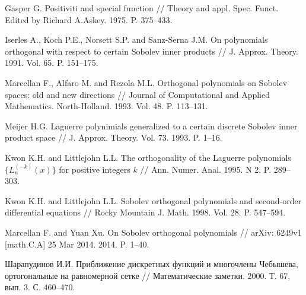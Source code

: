 \begin{thebibliography}{999}

 Gasper G. Positiviti and special function // Theory and appl. Spec. Funct. Edited by Richard A.Askey. 1975. P. 375--433.







Iserles A., Koch P.E., Norsett S.P. and Sanz-Serna J.M. On polynomials  orthogonal  with respect  to certain Sobolev inner products //
J. Approx. Theory. 1991. Vol. 65.  P. 151--175.







Marcellan F., Alfaro M. and Rezola M.L.
Orthogonal polynomials on Sobolev spaces: old and new directions //
Journal of Computational and Applied Mathematics. North-Holland. 1993. Vol. 48. P. 113--131.







Meijer H.G. Laguerre polynimials generalized to a certain discrete Sobolev inner product space // J. Approx. Theory. Vol. 73. 1993. P. 1--16.






Kwon K.H. and Littlejohn L.L.
The orthogonality of the Laguerre polynomials $\{L_n^{(-k)}(x)\}$ for positive integers $k$ //
Ann. Numer. Anal. 1995. N 2. P. 289--303.





 Kwon K.H. and Littlejohn L.L. Sobolev orthogonal polynomials and second-order differential equations // Rocky Mountain J. Math. 1998. Vol. 28. P. 547--594.





Marcellan F. and Yuan Xu.
On Sobolev orthogonal polynomials // arXiv: 6249v1 [math.C.A] 25 Mar 2014. 2014. P. 1--40.





 Шарапудинов И.И.
Приближение дискретных функций и многочлены Чебышева, ортогональные на равномерной сетке //
Математические заметки. 2000. Т. 67, вып. 3. С. 460--470.




\end{thebibliography}
